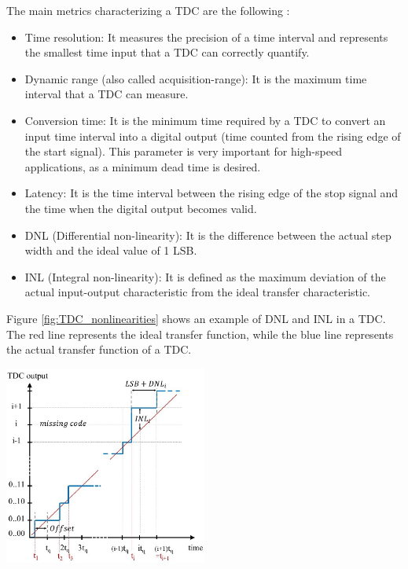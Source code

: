 The main metrics characterizing a TDC are the following \cite{EL-Hadbi_TDC_review_2019}:
\begin{itemize}
    \item Time resolution: It measures the precision of a time interval and represents the smallest time input that a TDC can correctly quantify.
    \item Dynamic range (also called acquisition-range): It is the maximum time interval that a TDC can measure.
    \item Conversion time: It is the minimum time required by a TDC to convert an input time interval into a digital output (time counted from the rising edge of the start signal). This
    parameter is very important for high-speed applications, as a minimum dead time is desired.
    \item Latency: It is the time interval between the rising edge of the stop signal and the time when the digital output becomes valid.
    \item DNL (Differential non-linearity): It is the difference between the actual step width and the ideal value of 1 LSB.
    \item INL (Integral non-linearity): It is defined as the maximum deviation of the actual input-output characteristic from the ideal transfer characteristic.
\end{itemize}

Figure \ref{fig:TDC_nonlinearities} shows an example of DNL and INL in a TDC. The red line represents the ideal transfer function, while the blue line represents the actual transfer
function of a TDC.

\begin{center}
    \includegraphics[width=0.5\textwidth]{figures/TDC_nonlinearities.png}
    \label{fig:TDC_nonlinearities}
\end{center}

